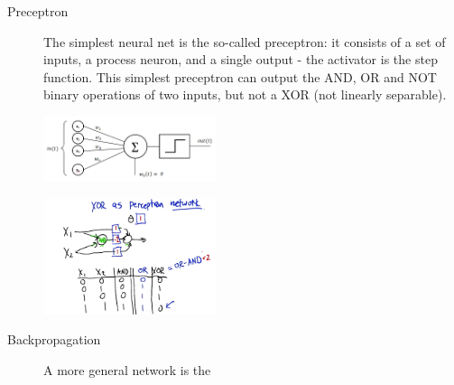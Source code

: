 \documentclass[10pt,landscape]{article}
\begin{document}
\begin{multicols*}{3}
\begin{description}
\item[Preceptron] The simplest neural net is the so-called preceptron: it consists of a
set of inputs, a process neuron, and a single output - the activator is the step function.
This simplest preceptron can output the AND, OR and NOT binary operations of two inputs,
but not a XOR (not linearly separable).

\begin{minipage}{\linewidth}
    \centering
    \includegraphics[width=2in]{figures/preceptron.png}
\end{minipage}

\begin{minipage}{\linewidth}
    \centering
    \includegraphics[width=2in]{figures/xornn.png}
\end{minipage}

\item[Backpropagation] A more general network is the

\end{description}

\end{multicols*}
\end{document}
